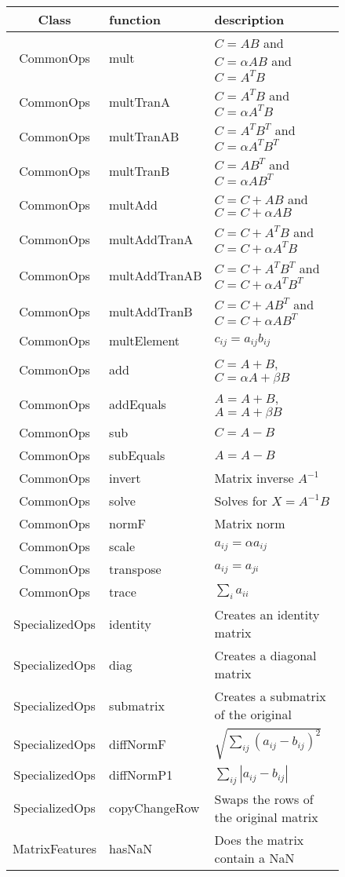\documentclass[12pt]{article}%
\begin{document}
\begin{figure}[h]
\begin{tabular}{cll}
Class & function & description \\
\hline
CommonOps & mult & $C = AB$ and $C = \alpha AB$ and $C = A^TB$ \\ 
CommonOps & multTranA & $C = A^TB$ and $C = \alpha A^TB$\\
CommonOps & multTranAB & $C = A^TB^T$ and $C = \alpha A^TB^T$\\
CommonOps & multTranB & $C = AB^T$ and $C = \alpha AB^T$\\
CommonOps & multAdd & $C = C+AB$ and $C = C+\alpha AB$\\
CommonOps & multAddTranA & $C = C+A^TB$ and $C = C+\alpha A^TB$\\
CommonOps & multAddTranAB & $C = C+A^TB^T$ and $C = C+\alpha A^TB^T$\\
CommonOps & multAddTranB & $C = C+AB^T$ and $C = C+\alpha AB^T$\\
CommonOps & multElement & $c_{ij} = a_{ij} b_{ij}$ \\
CommonOps & add & $C = A+B$, $C = \alpha A+\beta B$\\
CommonOps & addEquals & $A = A+B$, $A = A + \beta B$\\
CommonOps & sub & $C = A-B$ \\
CommonOps & subEquals & $A = A-B$\\
CommonOps & invert & Matrix inverse $A^{-1}$\\
CommonOps & solve & Solves for $X = A^{-1} B$\\
CommonOps & normF & Matrix norm \\
CommonOps & scale & $a_{ij} = \alpha a_{ij}$ \\
CommonOps & transpose & $a_{ij} = a_{ji}$ \\
CommonOps & trace & $\sum_i a_{ii}$ \\
SpecializedOps & identity & Creates an identity matrix \\
SpecializedOps & diag & Creates a diagonal matrix \\
SpecializedOps & submatrix & Creates a submatrix of the original \\
SpecializedOps & diffNormF & $\sqrt{\sum_{ij}(a_{ij}-b_{ij})^2 }$ \\
SpecializedOps & diffNormP1 & $\sum_{ij}|a_{ij}-b_{ij}|$ \\
SpecializedOps & copyChangeRow & Swaps the rows of the original matrix \\
MatrixFeatures & hasNaN & Does the matrix contain a NaN \\

\end{tabular}
\end{figure}
\end{document}
